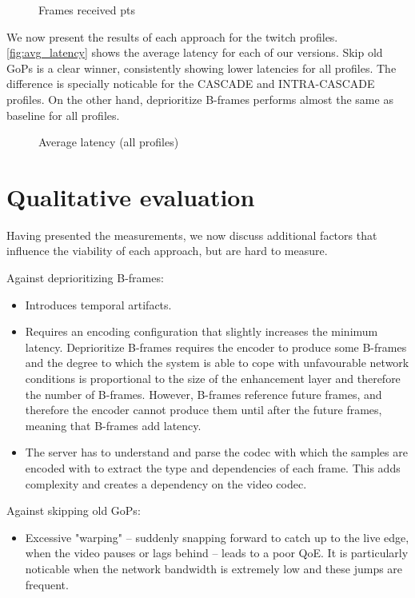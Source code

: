 \begin{figure}
    \centering
    
    \caption{Frames received pts}
    \label{fig:skipping_old_gops_intra_cascade:pts_received}
\end{figure}

We now present the results of each approach for the twitch profiles. \autoref{fig:avg_latency} shows the average latency for each of our versions. Skip old GoPs is a clear winner, consistently showing lower latencies for all profiles. The difference is specially noticable for the CASCADE and INTRA-CASCADE profiles. On the other hand, deprioritize B-frames performs almost the same as baseline for all profiles. %

\begin{figure}
    \centering
    
    \caption{Average latency (all profiles)}
    \label{fig:avg_latency}
\end{figure}

\section{Qualitative evaluation}
Having presented the measurements, we now discuss additional factors that influence the viability of each approach, but are hard to measure. 

Against deprioritizing B-frames:
\begin{itemize}
    \item Introduces temporal artifacts.
    \item Requires an encoding configuration that slightly increases the minimum latency. Deprioritize B-frames requires the encoder to produce some B-frames and the degree to which the system is able to cope with unfavourable network conditions is proportional to the size of the enhancement layer and therefore the number of B-frames. However, B-frames reference future frames, and therefore the encoder cannot produce them until after the future frames, meaning that B-frames add latency.
    \item The server has to understand and parse the codec with which the samples are encoded with to extract the type and dependencies of each frame. This adds complexity and creates a dependency on the video codec.
\end{itemize}

Against skipping old GoPs:
\begin{itemize}
    \item Excessive "warping" -- suddenly snapping forward to catch up to the live edge, when the video pauses or lags behind -- leads to a poor QoE. It is particularly noticable when the network bandwidth is extremely low and these jumps are frequent.
\end{itemize}

